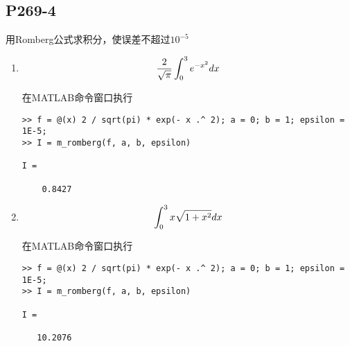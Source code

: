 \subsection{P269-4}

\renewcommand{\EPSILON}{{10}^{-5}}

用Romberg公式求积分，使误差不超过$\EPSILON$

\begin{enumerate}
\renewcommand{\FX}{e^{-x^{2}}}
\renewcommand{\LRANGE}{0}
\renewcommand{\RRANGE}{1}

\item \begin{displaymath}
\frac{2}{\sqrt{\pi}} \INTRANGE{\FX}{x}
\end{displaymath}

\begin{SOLVE}
在MATLAB命令窗口执行
\begin{lstlisting}
>> f = @(x) 2 / sqrt(pi) * exp(- x .^ 2); a = 0; b = 1; epsilon = 1E-5;
>> I = m_romberg(f, a, b, epsilon)

I =

    0.8427

\end{lstlisting}
\end{SOLVE}
\renewcommand{\FX}{x \sqrt{1 + x ^ 2}}
\renewcommand{\LRANGE}{0}
\renewcommand{\RRANGE}{3}

\item \begin{displaymath}
\INTRANGE{\FX}{x}
\end{displaymath}

\begin{SOLVE}
在MATLAB命令窗口执行
\begin{lstlisting}
>> f = @(x) 2 / sqrt(pi) * exp(- x .^ 2); a = 0; b = 1; epsilon = 1E-5;
>> I = m_romberg(f, a, b, epsilon)

I =

   10.2076

\end{lstlisting}
\end{SOLVE}
\end{enumerate}
